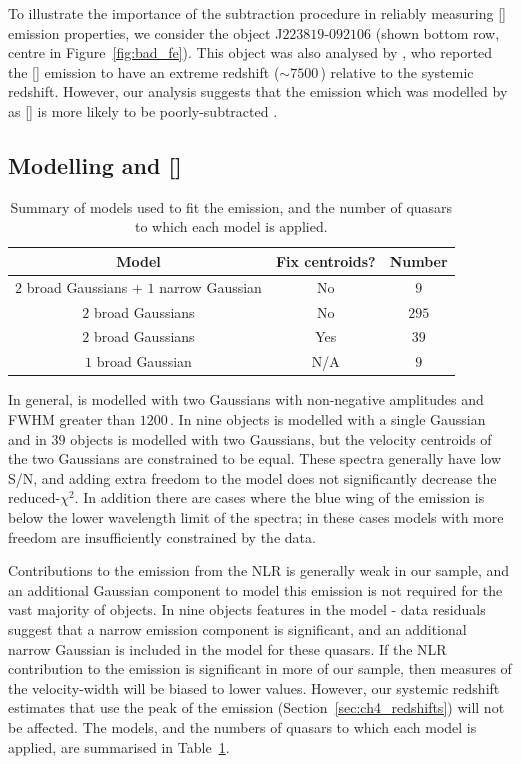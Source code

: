 To illustrate the importance of the  subtraction procedure in reliably measuring [] emission properties, we consider the object J$223819$-$092106$ (shown bottom row, centre in Figure~\ref{fig:bad_fe}).
This object was also analysed by \citet{shen16a}, who reported the [] emission to have an extreme redshift ($\sim7500$\,\kms) relative to the \citet{hewett10} systemic redshift.
However, our analysis suggests that the emission which was modelled by \citet{shen16a} as [] is more likely to be poorly-subtracted .

\subsection{Modelling \hb and []}
\label{sec:oiiimodel}

\begin{table}
  \centering
  \footnotesize
    \begin{tabular}{ccc}
    \hline
    Model & Fix centroids? & Number \\
    \hline
    $2$ broad Gaussians + $1$ narrow Gaussian & No & $9$ \\
    $2$ broad Gaussians & No  &  $295$ \\
    $2$ broad Gaussians & Yes &  $39$ \\
    $1$ broad Gaussian  & N/A &  $9$ \\
    \hline
    \end{tabular}
    \caption[{Summary of models used to fit the \hb emission, and the number of quasars to which each model is applied.}]{Summary of models used to fit the \hb emission, and the number of quasars to which each model is applied.}
  \label{tab:hbmod}
\end{table}

In general, \hb is modelled with two Gaussians with non-negative amplitudes and FWHM greater than $1200$\,\kms.
In nine objects \hb is modelled with a single Gaussian and in $39$ objects \hb is modelled with two Gaussians, but the velocity centroids of the two Gaussians are constrained to be equal.
These spectra generally have low S/N, and adding extra freedom to the model does not significantly decrease the  reduced-$\chi^2$.
In addition there are cases where the blue wing of the \hb emission is below the lower wavelength limit of the spectra; in these cases models with more freedom are insufficiently constrained by the data.

Contributions to the \hb emission from the NLR is generally weak in our sample, and an additional Gaussian component to model this emission is not required for the vast majority of objects.
In nine objects features in the model - data residuals suggest that a narrow emission component is significant, and an additional narrow Gaussian is included in the model for these quasars.
If the NLR contribution to the \hb emission is significant in more of our sample, then measures of the \hb velocity-width will be biased to lower values.
However, our systemic redshift estimates that use the peak of the \hb emission (Section~\ref{sec:ch4_redshifts}) will not be affected.
The \hb models, and the numbers of quasars to which each model is applied, are summarised in Table~\ref{tab:hbmod}.

